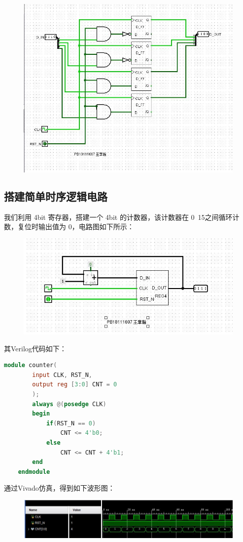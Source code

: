 \documentclass[UTF8]{article}
\begin{document}
	\begin{figure}[H]
		\centering
		\includegraphics[width=1\linewidth]{step5_register_resetTo1100.jpg}
		\label{step5_register_resetTo1100}
	\end{figure}


	\subsection{搭建简单时序逻辑电路}
	我们利用 4bit 寄存器，搭建一个 4bit 的计数器，该计数器在 0~15之间循环计数，复位时输出值为 0，电路图如下所示：
	\begin{figure}[H]
		\centering
		\includegraphics[width=1\linewidth]{step6_counter.jpg}
		\label{step6_counter}
	\end{figure}
	其Verilog代码如下：
	\begin{lstlisting}[language=Verilog]
	module counter(
		input CLK, RST_N,
		output reg [3:0] CNT = 0
		);
		always @(posedge CLK)
		begin
			if(RST_N == 0)
				CNT <= 4'b0;
			else
				CNT <= CNT + 4'b1;
		end
	endmodule
	\end{lstlisting}
	通过Vivado仿真，得到如下波形图：
	\begin{figure}[H]
		\centering
		\includegraphics[width=1\linewidth]{step6_Verilog_Simulation.jpg}
		\label{step6_Verilog_Simulation}
	\end{figure}
	
\end{document}
